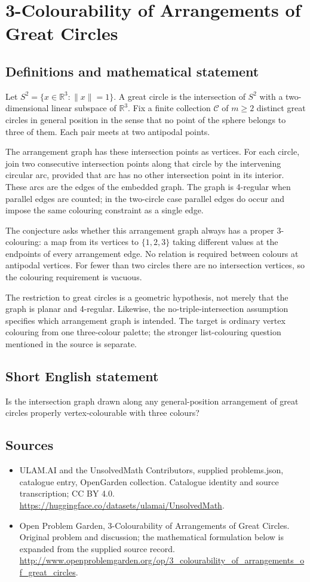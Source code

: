 \documentclass[11pt,a4paper]{article}
\begin{document}
\section*{3-Colourability of Arrangements of Great Circles}\label{statement}

\subsection{Definitions and mathematical statement}
Let $S^2=\{x\in\mathbb R^3:\|x\|=1\}$. A great circle is the
intersection of $S^2$ with a two-dimensional linear subspace of
$\mathbb R^3$. Fix a finite collection $\mathcal C$ of $m\ge2$
distinct great circles in general position in the sense that no
point of the sphere belongs to three of them. Each pair meets at
two antipodal points.

The arrangement graph has these intersection points as vertices.
For each circle, join two consecutive intersection points along
that circle by the intervening circular arc, provided that arc has
no other intersection point in its interior. These arcs are the
edges of the embedded graph. The graph is 4-regular when parallel
edges are counted; in the two-circle case parallel edges do occur
and impose the same colouring constraint as a single edge.

The conjecture asks whether this arrangement graph always has a
proper 3-colouring: a map from its vertices to $\{1,2,3\}$ taking
different values at the endpoints of every arrangement edge.
No relation is required between colours at antipodal vertices.
For fewer than two circles there are no intersection vertices,
so the colouring requirement is vacuous.

The restriction to great circles is a geometric hypothesis, not
merely that the graph is planar and 4-regular. Likewise, the
no-triple-intersection assumption specifies which arrangement graph
is intended. The target is ordinary vertex colouring from one
three-colour palette; the stronger list-colouring question mentioned
in the source is separate.
\subsection{Short English statement}
Is the intersection graph drawn along any general-position arrangement of great circles properly vertex-colourable with three colours?
\subsection{Sources}
\begin{itemize}
\item[S1] ULAM.AI and the UnsolvedMath Contributors, supplied problems.json, catalogue entry, OpenGarden collection. Catalogue identity and source transcription; CC BY 4.0.
\url{https://huggingface.co/datasets/ulamai/UnsolvedMath}.
\item[S2] Open Problem Garden, 3-Colourability of Arrangements of Great Circles. Original problem and discussion; the mathematical formulation below is expanded from the supplied source record.
\url{http://www.openproblemgarden.org/op/3_colourability_of_arrangements_of_great_circles}.
\end{itemize}
\end{document}
